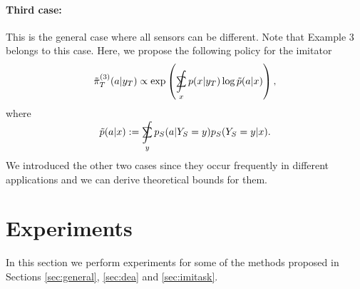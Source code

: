 \documentclass[letterpaper]{article} %
\theoremstyle{definition}%
\theoremstyle{definition}
\newcommand{\Obs}{Y}
\newcommand{\obs}{y}
\DeclareMathOperator*{\SumInt}{%
	\mathchoice%
	{\ooalign{$\sum$\cr\hidewidth$\displaystyle\int$\hidewidth\cr}}
	{\ooalign{\raisebox{.14\height}{\scalebox{.7}{$\textstyle\sum$}}\cr\hidewidth$\textstyle\int$\hidewidth\cr}}
	{\ooalign{\raisebox{.2\height}{\scalebox{.6}{$\scriptstyle\sum$}}\cr$\scriptstyle\int$\cr}}
	{\ooalign{\raisebox{.2\height}{\scalebox{.6}{$\scriptstyle\sum$}}\cr$\scriptstyle\int$\cr}}
}
\begin{document}
\paragraph{Third case:}
 This is the general case where all sensors can be different.
Note that Example 3 belongs to this case. 
 Here, we propose the following policy for the imitator
$$
\tilde{\pi}^{(3)}_T(a|\obs_T) \propto \exp\left(\SumInt_{x}p(x|\obs_T)\log \tilde{p}(a|x)\right), 
$$
where 
$$
\tilde{p}(a|x):=\SumInt_\obs p_S(a|\Obs_S=y)p_S(\Obs_S=y|x).
$$
We introduced the other two cases since they occur frequently in different applications and we can derive theoretical bounds for them.


\section{Experiments}
\label{sec:exp}

In this section we perform experiments for some of the methods proposed in Sections \ref{sec:general}, \ref{sec:dea} and \ref{sec:imitask}.
\end{document}
